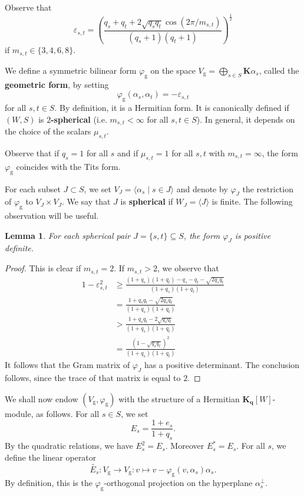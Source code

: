\documentclass[12pt,a4paper]{amsproc}
\newtheorem{lemma}[theorem]{Lemma}
\theoremstyle{definition}
\newcommand{\KK}{\mathbf K}
\begin{document}
Observe that 
\begin{equation}\label{eq:eps_st:2} 
\varepsilon_{s, t} =  
\displaystyle \left( \frac{q_s + q_t + 2\sqrt{q_s q_t}\cos(2\pi/m_{s, t})}{(q_s+1)(q_t+1)}\right)^{\frac 1 2}
\end{equation}	
if  $m_{s, t} \in \{ 3, 4, 6, 8\}$.


We define a symmetric bilinear form $\varphi_{\mathrm g}$ on the space $V_{\mathrm g} = \bigoplus_{s \in S} \KK \alpha_s$, called the \textbf{geometric form}, by setting 
$$\varphi_{\mathrm g}(\alpha_s, \alpha_t) = -\varepsilon_{s, t}$$
for all $s, t \in S$. By definition, it is a Hermitian form. It is canonically defined if  $(W, S)$ is \textbf{$2$-spherical} (i.e. $m_{s, t} < \infty$ for all $s, t \in S$). In general, it depends on the choice of the scalars $\mu_{s, t}$. 

Observe that if $q_s = 1$ for all $s$ and if $\mu_{s, t} =1$ for all $s, t$ with $m_{s, t} =\infty$, the form $\varphi_{\mathrm g}$  coincides with the Tits form. 

\medskip
For each subset $J \subset S$, we set $V_J = \langle \alpha_s \mid s \in J\rangle$ and denote  by $\varphi_J$ the restriction of  $\varphi_{\mathrm g}$ to $V_J \times V_J$. We say that $J$ is \textbf{spherical} if $W_J = \langle J \rangle$ is finite.
The following observation will be useful. 

\begin{lemma}\label{lem:pair-pos-def}
For each spherical pair $J = \{s, t\}\subseteq S$, the form $\varphi_J$ is positive definite. 
\end{lemma}
\begin{proof}
This is clear if $m_{s, t}=2$. If $m_{s, t} >2$, we observe that 
\begin{align*}
1-\varepsilon_{s, t}^2 & \geq \frac{(1+q_s)(1+q_t) - q_s - q_t - \sqrt{2 q_s q_t}}{(1+q_s)(1+q_t )}\\
&= \frac{1+q_s q_t -  \sqrt{2 q_s q_t}}{(1+q_s)(1+q_t )}\\
&> \frac{1+q_s q_t -  2\sqrt{ q_s q_t}}{(1+q_s)(1+q_t )}\\
&=\frac{(1-\sqrt{ q_s q_t})^2}{(1+q_s)(1+q_t )}
\end{align*}
It follows that the Gram matrix of   $\varphi_J$   has a positive determinant. The conclusion follows, since the trace of that matrix is equal to $2$.
\end{proof}
	
	
We shall now endow $(V_{\mathrm g}, \varphi_{\mathrm g})$ with the structure of a Hermitian $\KK_{\mathbf q}[W]$-module, as follows. For all $s \in S$, we set
$$E_s = \frac{1+e_s}{1+q_s}.$$
By the quadratic relations, we have $E_s^2 = E_s$. Moreover $E_s^* = E_s$. For all $s$, we define the linear operator
$$\widetilde{E_s} : V_{\mathrm g} \to V_{\mathrm g} : v \mapsto v-\varphi_{\mathrm g}(v, \alpha_s) \alpha_s.$$
By definition, this is the $\varphi_{\mathrm g}$-orthogonal projection on the hyperplane $\alpha_s^\perp$.
\end{document}
